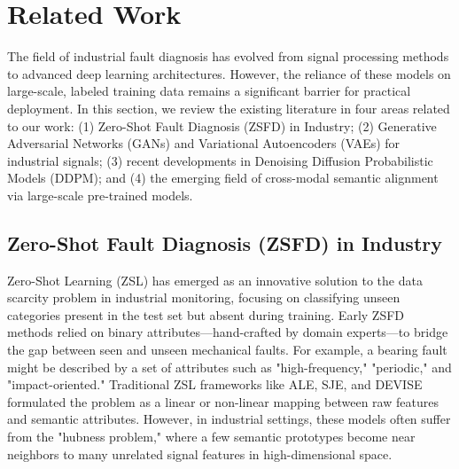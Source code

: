 \section{Related Work}
\label{sec:related_work}

The field of industrial fault diagnosis has evolved from signal processing methods to advanced deep learning architectures. However, the reliance of these models on large-scale, labeled training data remains a significant barrier for practical deployment. In this section, we review the existing literature in four areas related to our work: (1) Zero-Shot Fault Diagnosis (ZSFD) in Industry; (2) Generative Adversarial Networks (GANs) and Variational Autoencoders (VAEs) for industrial signals; (3) recent developments in Denoising Diffusion Probabilistic Models (DDPM); and (4) the emerging field of cross-modal semantic alignment via large-scale pre-trained models.

\subsection{Zero-Shot Fault Diagnosis (ZSFD) in Industry}
Zero-Shot Learning (ZSL) has emerged as an innovative solution to the data scarcity problem in industrial monitoring, focusing on classifying unseen categories present in the test set but absent during training. Early ZSFD methods relied on binary attributes—hand-crafted by domain experts—to bridge the gap between seen and unseen mechanical faults. For example, a bearing fault might be described by a set of attributes such as "high-frequency," "periodic," and "impact-oriented." Traditional ZSL frameworks like ALE, SJE, and DEVISE formulated the problem as a linear or non-linear mapping between raw features and semantic attributes. However, in industrial settings, these models often suffer from the "hubness problem," where a few semantic prototypes become near neighbors to many unrelated signal features in high-dimensional space.

